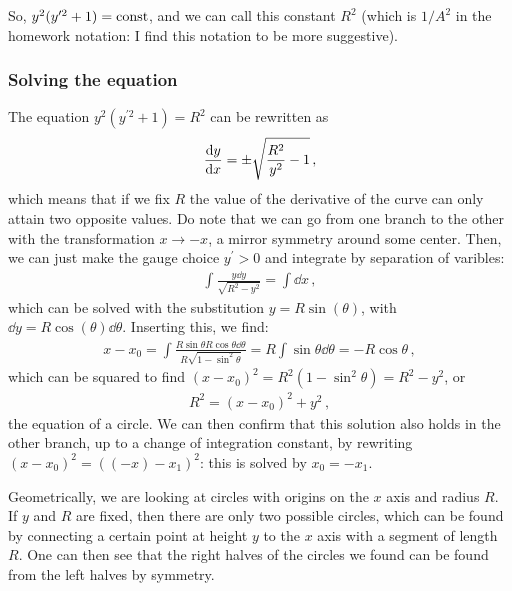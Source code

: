 \documentclass[main.tex]{subfiles}
\begin{document}
So, \(y^2 (y^{\prime 2} + 1) = \text{const}\), and we can call this constant \(R^2\) (which is \(1/A^2\) in the homework notation: I find this notation to be more suggestive).

\subsubsection{Solving the equation}

The equation \(y^2 (y^{\prime 2}+1) = R^2\) can be rewritten as 
%
\begin{align}
  \dv{y}{x} = \pm \sqrt{\frac{R^2}{y^2} - 1}
\,,
\end{align}
%
which means that if we fix \(R\) the value of the derivative of the curve can only attain two opposite values. Do note that we can go from one branch to the other with the transformation \(x \rightarrow -x\), a mirror symmetry around some center.
Then, we can just make the gauge choice \(y^{\prime }>0\) and integrate by separation of varibles: 
%
\begin{align}
  \int \frac{y \dd{y}}{\sqrt{R^2-y^2}} = \int \dd{x}
\,,
\end{align}
%
which can be solved with the substitution \( y = R \sin(\theta )\), with \(\dd{y} = R \cos(\theta ) \dd{\theta }\). Inserting this, we find: 
%
\begin{align}
  x - x_0  = \int \frac{R \sin\theta R \cos\theta  \dd{\theta }}{R \sqrt{1 - \sin^2 \theta }} 
  = R \int \sin \theta  \dd{\theta } = - R \cos \theta 
\,,
\end{align}
%
which can be squared to find \((x- x_0 )^2 = R^2 (1 - \sin^2 \theta ) = R^2 - y^2\), or 
%
\begin{align}
  R^2 = (x-x_0  )^2 + y^2
\,,
\end{align}
%
the equation of a circle.
We can then confirm that this solution also holds in the other branch, up to a change of integration constant, by rewriting \((x- x_0 )^2 = ((-x) - x_1 )^2\): this is solved by \(x_0 = - x_1 \). 

Geometrically, we are looking at circles with origins on the \(x\) axis and radius \(R\). If \(y\) and \(R\) are fixed, then there are only two possible circles, which can be found by connecting a certain point at height \(y\) to the \(x\) axis with a segment of length \(R\).
One can then see that the right halves of the circles we found can be found from the left halves by symmetry.
\end{document}
